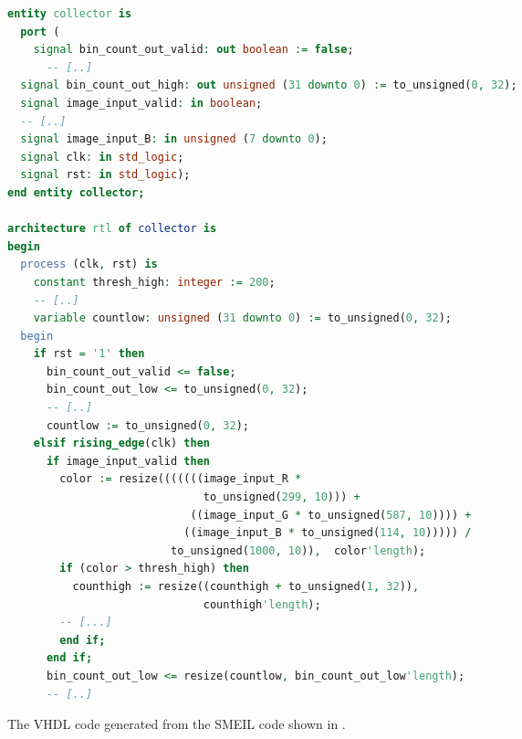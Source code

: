 \begin{widefigure}[hb!]
\begin{lstlisting}[language=vhdl]
entity collector is
  port (
    signal bin_count_out_valid: out boolean := false;
      -- [..]
  signal bin_count_out_high: out unsigned (31 downto 0) := to_unsigned(0, 32);
  signal image_input_valid: in boolean;
  -- [..]
  signal image_input_B: in unsigned (7 downto 0);
  signal clk: in std_logic;
  signal rst: in std_logic);
end entity collector;

architecture rtl of collector is
begin
  process (clk, rst) is
    constant thresh_high: integer := 200;
    -- [..]
    variable countlow: unsigned (31 downto 0) := to_unsigned(0, 32);
  begin
    if rst = '1' then
      bin_count_out_valid <= false;
      bin_count_out_low <= to_unsigned(0, 32);
      -- [..]
      countlow := to_unsigned(0, 32);
    elsif rising_edge(clk) then
      if image_input_valid then
        color := resize(((((((image_input_R *
                              to_unsigned(299, 10))) +
                            ((image_input_G * to_unsigned(587, 10)))) +
                           ((image_input_B * to_unsigned(114, 10))))) /
                         to_unsigned(1000, 10)),  color'length);
        if (color > thresh_high) then
          counthigh := resize((counthigh + to_unsigned(1, 32)),
                              counthigh'length);
        -- [...]
        end if;
      end if;
      bin_count_out_low <= resize(countlow, bin_count_out_low'length);
      -- [..]
\end{lstlisting}
  \caption{The VHDL code generated from the SMEIL code shown in
    .}
  \label{fig:vhdlc}
\end{widefigure}

  
